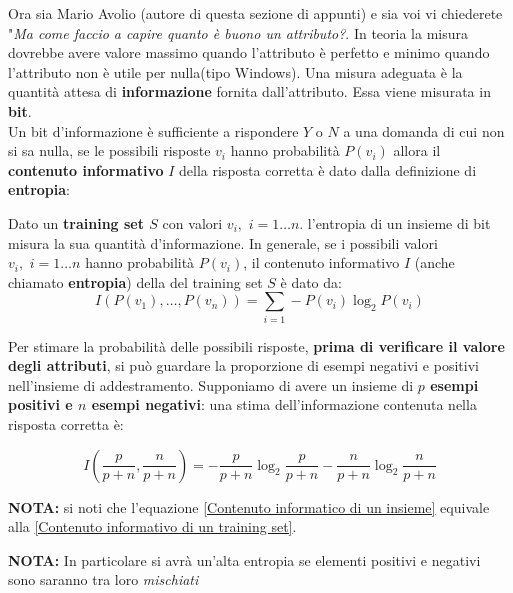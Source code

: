 Ora sia Mario Avolio (autore di questa sezione di appunti) e sia voi vi chiederete "\textit{Ma come faccio a capire quanto è buono un attributo?}. In teoria la misura dovrebbe avere valore massimo quando l'attributo è perfetto e minimo quando l'attributo non è utile per nulla(tipo Windows). Una misura adeguata è la quantità attesa di \textbf{informazione} fornita dall'attributo. Essa viene misurata in \textbf{bit}. \\ Un bit d'informazione è sufficiente a rispondere $Y$ o $N$ a una domanda di cui non si sa nulla, se le possibili risposte $v_i$ hanno probabilità $P(v_i)$ allora il \textbf{contenuto informativo} $I$ della risposta corretta è dato dalla definizione di \textbf{entropia}:
\begin{definizione}
  Dato un \textbf{training set $S$} con valori $v_i,\,\, i=1\ldots n$. l'entropia di un
  insieme di bit misura la sua quantità d'informazione. In generale, se i possibili valori $v_i,\,\, i=1\ldots n$ hanno probabilità $P(v_i)$, il contenuto informativo $I$ (anche chiamato \textbf{entropia}) della del training set $S$ è dato da:
  \begin{equation}
\label{Contenuto informativo di un training set}
  I(P(v_1),\ldots, P(v_n))=\sum_{i=1}-P(v_i)\log_2P(v_i)
\end{equation}
  \end{definizione}
  \begin{definizione}
      Per stimare la probabilità delle possibili risposte, \textbf{prima di verificare il valore degli attributi}, si può guardare la proporzione di esempi negativi e positivi nell'insieme di addestramento. Supponiamo di avere un insieme di \textbf{$p$ esempi positivi e $n$ esempi negativi}: una stima dell'informazione contenuta nella risposta corretta è:
    
      \begin{equation}
\label{Contenuto informatico di un insieme}
  I\left(\frac{p}{p+n},\frac{n}{p+n}\right)=-\frac{p}{p+n}\log_2\frac{p}{p+n}
    -\frac{n}{p+n}\log_2\frac{n}{p+n}
    \end{equation}
      \end{definizione}
      \textbf{NOTA:} si noti che l'equazione \ref{Contenuto informatico di un insieme} equivale alla \ref{Contenuto informativo di un training set}.

\textbf{NOTA:}
  In particolare si avrà un'alta entropia se elementi positivi e negativi sono saranno tra loro \textit{mischiati}
  

